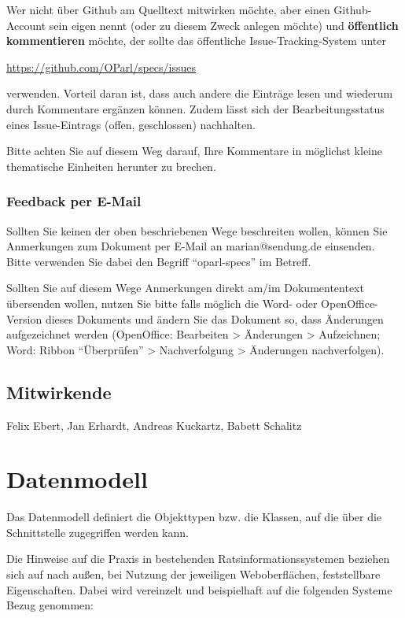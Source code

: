 \documentclass[,a4paper]{article}
\begin{document}
Wer nicht über Github am Quelltext mitwirken möchte, aber einen
Github-Account sein eigen nennt (oder zu diesem Zweck anlegen möchte)
und \textbf{öffentlich kommentieren} möchte, der sollte das öffentliche
Issue-Tracking-System unter

\href{https://github.com/OParl/specs/issues}{https://github.com/OParl/specs/issues}

verwenden. Vorteil daran ist, dass auch andere die Einträge lesen und
wiederum durch Kommentare ergänzen können. Zudem lässt sich der
Bearbeitungsstatus eines Issue-Eintrags (offen, geschlossen) nachhalten.

Bitte achten Sie auf diesem Weg darauf, Ihre Kommentare in möglichst
kleine thematische Einheiten herunter zu brechen.

\subsubsection{Feedback per E-Mail}

Sollten Sie keinen der oben beschriebenen Wege beschreiten wollen,
können Sie Anmerkungen zum Dokument per E-Mail an marian@sendung.de
einsenden. Bitte verwenden Sie dabei den Begriff ``oparl-specs'' im
Betreff.

Sollten Sie auf diesem Wege Anmerkungen direkt am/im Dokumententext
übersenden wollen, nutzen Sie bitte falls möglich die Word- oder
OpenOffice-Version dieses Dokuments und ändern Sie das Dokument so, dass
Änderungen aufgezeichnet werden (OpenOffice: Bearbeiten \textgreater{}
Änderungen \textgreater{} Aufzeichnen; Word: Ribbon ``Überprüfen''
\textgreater{} Nachverfolgung \textgreater{} Änderungen nachverfolgen).

\subsection{Mitwirkende}

Felix Ebert, Jan Erhardt, Andreas Kuckartz, Babett Schalitz

\section{Datenmodell}

Das Datenmodell definiert die Objekttypen bzw. die Klassen, auf die über
die Schnittstelle zugegriffen werden kann.

Die Hinweise auf die Praxis in bestehenden Ratsinformationssystemen
beziehen sich auf nach außen, bei Nutzung der jeweiligen Weboberflächen,
feststellbare Eigenschaften. Dabei wird vereinzelt und beispielhaft auf
die folgenden Systeme Bezug genommen:
\end{document}
